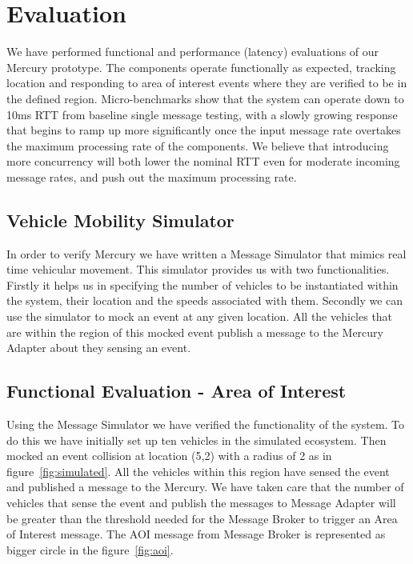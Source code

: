 \section{Evaluation}

We have performed functional and performance (latency) evaluations of
our Mercury prototype.  The components operate functionally as
expected, tracking location and responding to area of interest events
where they are verified to be in the defined region. Micro-benchmarks
show that the system can operate down to 10ms RTT from baseline single
message testing, with a slowly growing response that begins to ramp up
more significantly once the input message rate overtakes the maximum
processing rate of the components.  We believe that introducing more
concurrency will both lower the nominal RTT even for moderate incoming
message rates, and push out the maximum processing rate.

\subsection{Vehicle Mobility Simulator}
In order to verify Mercury we have written a Message Simulator that
mimics real time vehicular movement. This simulator provides us with
two functionalities. Firstly it helps us in specifying the number of
vehicles to be instantiated within the system, their location and the
speeds associated with them. Secondly we can use the simulator to mock
an event at any given location. All the vehicles that are within the
region of this mocked event publish a message to the Mercury Adapter
about they sensing an event.

\subsection{Functional Evaluation - Area of Interest}
Using the Message Simulator we have verified the functionality of the
system.  To do this we have initially set up ten vehicles in the
simulated ecosystem.  Then mocked an event collision at location (5,2)
with a radius of 2 as in figure~\ref{fig:simulated}. All the vehicles
within this region have sensed the event and published a message to
the Mercury. We have taken care that the number of vehicles that sense
the event and publish the messages to Message Adapter will be greater
than the threshold needed for the Message Broker to trigger an Area of
Interest message. The AOI message from Message Broker is represented
as bigger circle in the figure~\ref{fig:aoi}.


